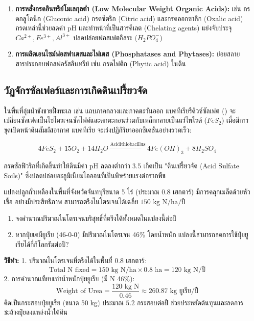 \begin{enumerate}
    \item \textbf{การหลั่งกรดอินทรีย์โมเลกุลต่ำ (Low Molecular Weight Organic Acids):} เช่น กรดกลูโคนิก (Gluconic acid) กรดซิตริก (Citric acid) และกรดออกซาลิก (Oxalic acid) กรดเหล่านี้ช่วยลดค่า pH และทำหน้าที่เป็นสารคีเลต (Chelating agents) แย่งจับประจุ $Ca^{2+}, Fe^{3+}, Al^{3+}$ ปลดปล่อยฟอสเฟตอิสระ ($H_2PO_4^-$)
    \item \textbf{การผลิตเอนไซม์ฟอสฟาเตสและไฟเตส (Phosphatases and Phytases):} ย่อยสลายสารประกอบฟอสฟอรัสอินทรีย์ เช่น กรดไฟติก (Phytic acid) ในดิน
\end{enumerate}

\subsection{วัฏจักรซัลเฟอร์และการเกิดดินเปรี้ยวจัด}

ในพื้นที่ลุ่มน้ำขังชายฝั่งทะเล เช่น แถบภาคกลางและภาคตะวันออก แบคทีเรียรีดิวซ์ซัลเฟต () จะเปลี่ยนซัลเฟตเป็นไฮโดรเจนซัลไฟด์และตกตะกอนร่วมกับเหล็กกลายเป็นแร่ไพไรต์ ($FeS_2$) เมื่อมีการขุดเปิดหน้าดินสัมผัสอากาศ แบคทีเรีย  จะเร่งปฏิกิริยาออกซิเดชันอย่างรวดเร็ว:

\begin{equation}
4FeS_2 + 15O_2 + 14H_2O \xrightarrow{\text{Acidithiobacillus}} 4Fe(OH)_3 + 8H_2SO_4
\end{equation}

กรดซัลฟิวริกที่เกิดขึ้นทำให้ดินมีค่า pH ลดลงต่ำกว่า 3.5 เกิดเป็น "ดินเปรี้ยวจัด (Acid Sulfate Soils)" ซึ่งปลดปล่อยอะลูมิเนียมไอออนที่เป็นพิษร้ายแรงต่อรากพืช

\begin{worked}
แปลงปลูกถั่วเหลืองในพื้นที่จังหวัดจันทบุรีขนาด 5 ไร่ (ประมาณ 0.8 เฮกตาร์) มีการคลุกเมล็ดด้วยหัวเชื้อ  อย่างมีประสิทธิภาพ สามารถตรึงไนโตรเจนได้เฉลี่ย $150\text{ kg N/ha/ปี}$
\begin{enumerate}
    \item จงคำนวณปริมาณไนโตรเจนบริสุทธิ์ที่ตรึงได้ทั้งหมดในแปลงนี้ต่อปี
    \item หากปุ๋ยเคมียูเรีย ($46\text{-}0\text{-}0$) มีปริมาณไนโตรเจน 46\% โดยน้ำหนัก แปลงนี้สามารถลดการใช้ปุ๋ยยูเรียได้กี่กิโลกรัมต่อปี?
\end{enumerate}

\textbf{วิธีทำ:}
1. ปริมาณไนโตรเจนที่ตรึงได้ในพื้นที่ 0.8 เฮกตาร์:
$$\text{Total N fixed} = 150\text{ kg N/ha} \times 0.8\text{ ha} = 120\text{ kg N/ปี}$$
2. การคำนวณเทียบเท่าน้ำหนักปุ๋ยยูเรีย (มี N 46\%):
$$\text{Weight of Urea} = \frac{120\text{ kg N}}{0.46} \approx 260.87\text{ kg ยูเรีย/ปี}$$
คิดเป็นกระสอบปุ๋ยยูเรีย (ขนาด 50 kg) ประมาณ $5.2$ กระสอบต่อปี ช่วยประหยัดต้นทุนและลดการชะล้างปุ๋ยลงแหล่งน้ำใต้ดิน
\end{worked}

